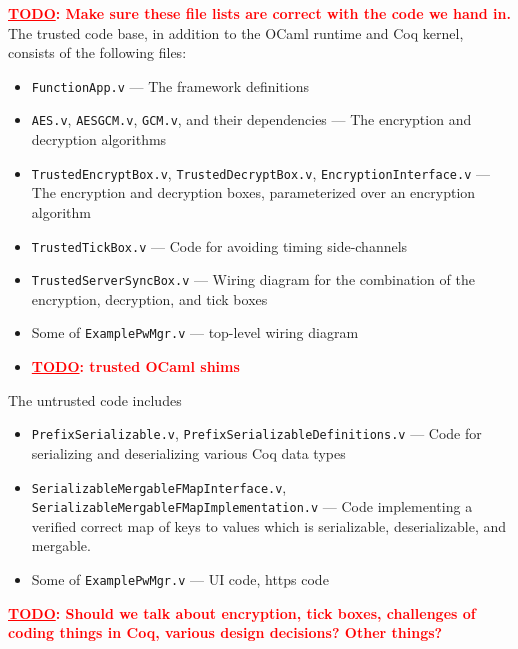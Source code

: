 \documentclass{article}
\newcommand{\todo}[1]{\textbf{\textcolor{red}{\underline{TODO}: #1}}}
\begin{document}
\todo{Make sure these file lists are correct with the code we hand in.}
The trusted code base, in addition to the OCaml runtime and Coq kernel, consists of the following files:
\begin{itemize}
  \item \texttt{FunctionApp.v} --- The framework definitions
  \item \texttt{AES.v}, \texttt{AESGCM.v}, \texttt{GCM.v}, and their dependencies --- The encryption and decryption algorithms
  \item \texttt{TrustedEncryptBox.v}, \texttt{TrustedDecryptBox.v}, \texttt{EncryptionInterface.v} --- The encryption and decryption boxes, parameterized over an encryption algorithm
  \item \texttt{TrustedTickBox.v} --- Code for avoiding timing side-channels
  \item \texttt{TrustedServerSyncBox.v} --- Wiring diagram for the combination of the encryption, decryption, and tick boxes
  \item Some of \texttt{ExamplePwMgr.v} --- top-level wiring diagram
  \item \todo{trusted OCaml shims}
\end{itemize}


The untrusted code includes
\begin{itemize}
  \item \texttt{PrefixSerializable.v}, \texttt{PrefixSerializableDefinitions.v} --- Code for serializing and deserializing various Coq data types
  \item \texttt{SerializableMergableFMapInterface.v}, \texttt{SerializableMergableFMapImplementation.v} --- Code implementing a verified correct map of keys to values which is serializable, deserializable, and mergable.
  \item Some of \texttt{ExamplePwMgr.v} --- UI code, https code
\end{itemize}

\todo{Should we talk about encryption, tick boxes, challenges of coding things in Coq, various design decisions?  Other things?}
\end{document}
